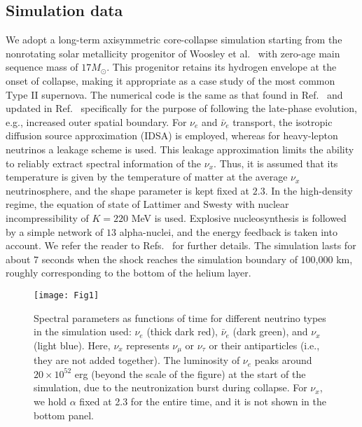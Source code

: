 \documentclass[aps,reprint,superscriptaddress]{revtex4-1}
\begin{document}
\subsection{Simulation data} \label{sec:simData}

We adopt a long-term axisymmetric core-collapse simulation starting from the nonrotating solar metallicity progenitor of Woosley et al.~\cite{Woosley:2002zz} with zero-age main sequence mass of $17 M_\odot$. This progenitor retains its hydrogen envelope at the onset of collapse, making it appropriate as a case study of the most common Type II supernova. The numerical code is the same as that found in Ref.~\cite{Nakamura:2014caa} and updated in Ref.~\cite{Nakamura:2016kkl} specifically for the purpose of following the late-phase evolution, e.g., increased outer spatial boundary. For $\nu_e$ and $\bar{\nu}_e$ transport, the isotropic diffusion source approximation (IDSA) \cite{Liebendoerfer:2007dz} is employed, whereas for heavy-lepton neutrinos a leakage scheme is used. This leakage approximation limits the ability to reliably extract spectral information of the $\nu_x$. Thus, it is assumed that its temperature is given by the temperature of matter at the average $\nu_x$ neutrinosphere, and the shape parameter is kept fixed at $2.3$. In the high-density regime, the equation of state of Lattimer and Swesty \cite{Lattimer:1991nc} with nuclear incompressibility of $K=220$ MeV is used. Explosive nucleosynthesis is followed by a simple network of $13$ alpha-nuclei, and the energy feedback is taken into account. We refer the reader to Refs.~\cite{Nakamura:2014caa,Nakamura:2016kkl} for further details. The simulation lasts for about 7 seconds when the shock reaches the simulation boundary of 100,000 km, roughly corresponding to the bottom of the helium layer. 

\begin{figure}[t]
\centering
\texttt{[image: Fig1]}
\caption{Spectral parameters as functions of time for different neutrino types in the simulation used: $\nu_e$ (thick dark red), $\bar{\nu}_e$ (dark green), and $\nu_x$ (light blue).  Here, $\nu_{x}$ represents $\nu_{\mu}$ or $\nu_{\tau}$ or their antiparticles (i.e., they are not added together).  The luminosity of $\nu_{e}$ peaks around $20 \times 10^{52}$ erg (beyond the scale of the figure) at the start of the simulation, due to the neutronization burst during collapse. For $\nu_{x}$, we hold $\alpha$ fixed at 2.3 for the entire time, and it is not shown in the bottom panel.}
\label{fig:simData}
\end{figure}
\end{document}
